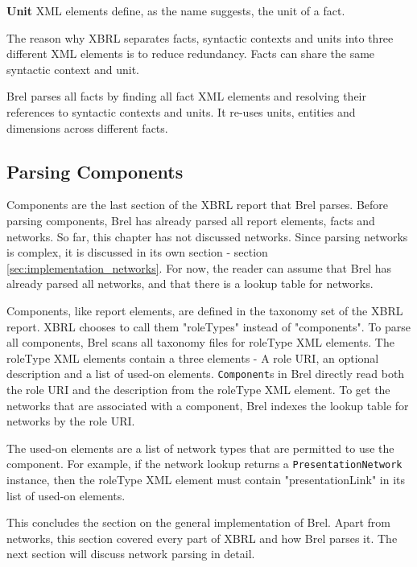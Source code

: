 \textbf{Unit} XML elements define, as the name suggests, the unit of a fact.

The reason why XBRL separates facts, syntactic contexts and units into three different XML elements is to reduce redundancy.
Facts can share the same syntactic context and unit.

Brel parses all facts by finding all fact XML elements and resolving their references to syntactic contexts and units.
It re-uses units, entities and dimensions across different facts. 

\subsection{Parsing Components}
\label{sec:implementation_components}

Components are the last section of the XBRL report that Brel parses.
Before parsing components, Brel has already parsed all report elements, facts and networks.
So far, this chapter has not discussed networks.
Since parsing networks is complex, it is discussed in its own section - section \ref{sec:implementation_networks}.
For now, the reader can assume that Brel has already parsed all networks, and that there is a lookup table for networks.

Components, like report elements, are defined in the taxonomy set of the XBRL report.
XBRL chooses to call them "roleTypes" instead of "components".
To parse all components, Brel scans all taxonomy files for roleType XML elements.
The roleType XML elements contain a three elements - A role URI, an optional description and a list of used-on elements.
\texttt{Component}s in Brel directly read both the role URI and the description from the roleType XML element.
To get the networks that are associated with a component, Brel indexes the lookup table for networks by the role URI.

The used-on elements are a list of network types that are permitted to use the component.
For example, if the network lookup returns a \texttt{PresentationNetwork} instance, 
then the roleType XML element must contain "presentationLink" in its list of used-on elements.

This concludes the section on the general implementation of Brel.
Apart from networks, this section covered every part of XBRL and how Brel parses it.
The next section will discuss network parsing in detail.

